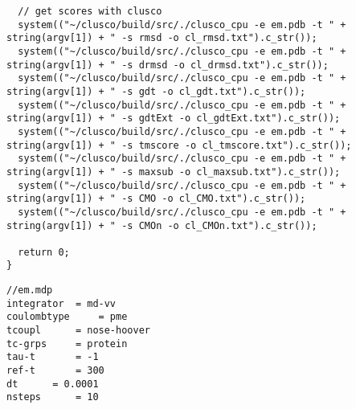 \documentclass[11pt]{article}
\begin{document}
\begin{lstlisting}
  // get scores with clusco
  system(("~/clusco/build/src/./clusco_cpu -e em.pdb -t " + string(argv[1]) + " -s rmsd -o cl_rmsd.txt").c_str());
  system(("~/clusco/build/src/./clusco_cpu -e em.pdb -t " + string(argv[1]) + " -s drmsd -o cl_drmsd.txt").c_str());
  system(("~/clusco/build/src/./clusco_cpu -e em.pdb -t " + string(argv[1]) + " -s gdt -o cl_gdt.txt").c_str());
  system(("~/clusco/build/src/./clusco_cpu -e em.pdb -t " + string(argv[1]) + " -s gdtExt -o cl_gdtExt.txt").c_str());
  system(("~/clusco/build/src/./clusco_cpu -e em.pdb -t " + string(argv[1]) + " -s tmscore -o cl_tmscore.txt").c_str());
  system(("~/clusco/build/src/./clusco_cpu -e em.pdb -t " + string(argv[1]) + " -s maxsub -o cl_maxsub.txt").c_str());
  system(("~/clusco/build/src/./clusco_cpu -e em.pdb -t " + string(argv[1]) + " -s CMO -o cl_CMO.txt").c_str());
  system(("~/clusco/build/src/./clusco_cpu -e em.pdb -t " + string(argv[1]) + " -s CMOn -o cl_CMOn.txt").c_str());

  return 0;
}
\end{lstlisting}

\begin{lstlisting}
//em.mdp
integrator	= md-vv
coulombtype 	= pme
tcoupl 		= nose-hoover
tc-grps		= protein
tau-t		= -1
ref-t		= 300
dt		= 0.0001
nsteps		= 10
\end{lstlisting}
\end{document}
